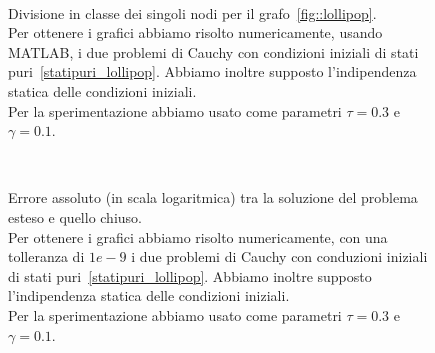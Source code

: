 \begin{figure}
	
	\centering
\subfloat[][Nodo 1]
{\resizebox{0.45\textwidth}{!}{}}
 \quad 
\subfloat[][Nodo 2]
{\resizebox{0.45\textwidth}{!}{ }}
\\
\subfloat[][Nodo 3]
{\resizebox{0.45\textwidth}{!}
{}
}
\quad
\subfloat[][Nodo 4]
{\resizebox{0.45\textwidth}{!}
{}
}
\caption[Sperimentazione in MATLAB relativo al grafo~\ref{fig::lollipop}]{Divisione in classe dei singoli nodi per il grafo~\ref{fig::lollipop}.\\
	Per ottenere i grafici abbiamo risolto numericamente, usando MATLAB, i due problemi di Cauchy con condizioni iniziali di stati puri~\eqref{statipuri_lollipop}. Abbiamo inoltre supposto l'indipendenza statica delle condizioni iniziali.\\
	Per la sperimentazione abbiamo usato come parametri $\tau = 0.3$ e $\gamma = 0.1$.}	\label{fig::plot_lollipop}
\end{figure}

\begin{figure}[!htb]
	\subfloat[][Nodo 1]
{\resizebox{0.45\textwidth}{!}{}}
 \quad 
\subfloat[][Nodo 2]
{\resizebox{0.45\textwidth}{!}{ }}
\\
\subfloat[][Nodo 3]
{\resizebox{0.45\textwidth}{!}
{}
}
\quad
\subfloat[][Nodo 4]
{\resizebox{0.45\textwidth}{!}
{}
}
\caption[Errori assoluti relativi al grafo~\ref{fig::lollipop} tra il modello esatto e con cut-vertex] {Errore assoluto (in scala logaritmica) tra la soluzione del problema esteso  e quello chiuso.\\
Per ottenere i grafici abbiamo risolto numericamente, con una tolleranza di $1e-9$ i due problemi di Cauchy con conduzioni iniziali di stati puri~\eqref{statipuri_lollipop}. Abbiamo inoltre supposto l'indipendenza statica delle condizioni iniziali.\\
Per la sperimentazione abbiamo usato come parametri $\tau = 0.3$ e $\gamma = 0.1$.}
\label{fig::lollipop_errori}

\end{figure}


